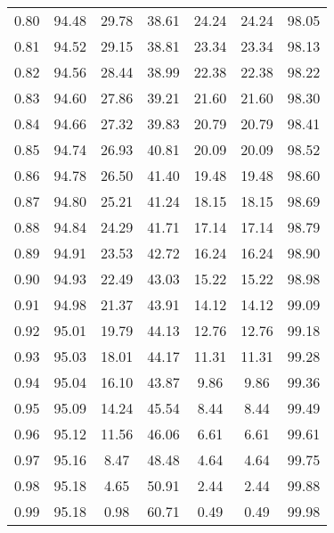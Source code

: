 \begin{tabular}{|c|c|c|c|c|c|c|}
      0.80 &     94.48 &     29.78 &      38.61 &   24.24 &      24.24 &         98.05 \\
      0.81 &     94.52 &     29.15 &      38.81 &   23.34 &      23.34 &         98.13 \\
      0.82 &     94.56 &     28.44 &      38.99 &   22.38 &      22.38 &         98.22 \\
      0.83 &     94.60 &     27.86 &      39.21 &   21.60 &      21.60 &         98.30 \\
      0.84 &     94.66 &     27.32 &      39.83 &   20.79 &      20.79 &         98.41 \\
      0.85 &     94.74 &     26.93 &      40.81 &   20.09 &      20.09 &         98.52 \\
      0.86 &     94.78 &     26.50 &      41.40 &   19.48 &      19.48 &         98.60 \\
      0.87 &     94.80 &     25.21 &      41.24 &   18.15 &      18.15 &         98.69 \\
      0.88 &     94.84 &     24.29 &      41.71 &   17.14 &      17.14 &         98.79 \\
      0.89 &     94.91 &     23.53 &      42.72 &   16.24 &      16.24 &         98.90 \\
      0.90 &     94.93 &     22.49 &      43.03 &   15.22 &      15.22 &         98.98 \\
      0.91 &     94.98 &     21.37 &      43.91 &   14.12 &      14.12 &         99.09 \\
      0.92 &     95.01 &     19.79 &      44.13 &   12.76 &      12.76 &         99.18 \\
      0.93 &     95.03 &     18.01 &      44.17 &   11.31 &      11.31 &         99.28 \\
      0.94 &     95.04 &     16.10 &      43.87 &    9.86 &       9.86 &         99.36 \\
      0.95 &     95.09 &     14.24 &      45.54 &    8.44 &       8.44 &         99.49 \\
      0.96 &     95.12 &     11.56 &      46.06 &    6.61 &       6.61 &         99.61 \\
      0.97 &     95.16 &      8.47 &      48.48 &    4.64 &       4.64 &         99.75 \\
      0.98 &     95.18 &      4.65 &      50.91 &    2.44 &       2.44 &         99.88 \\
      0.99 &     95.18 &      0.98 &      60.71 &    0.49 &       0.49 &         99.98 \\
\bottomrule
\end{tabular}
